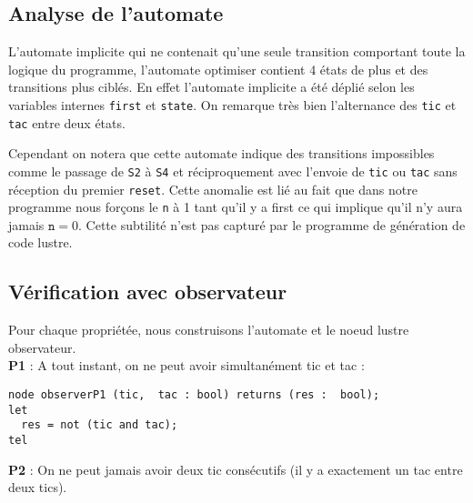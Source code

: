 \documentclass[a4paper]{article}
\begin{document}
\subsection{Analyse de l'automate}

L'automate implicite qui ne contenait qu'une seule transition comportant toute la
logique du programme, l'automate optimiser contient 4 états de plus et des
transitions plus ciblés. En effet l'automate implicite a été déplié selon les
variables internes \texttt{first} et \texttt{state}. On remarque très bien
l'alternance des \texttt{tic} et \texttt{tac} entre deux états. 

Cependant on notera que cette automate indique des transitions impossibles comme 
le passage de \texttt{S2} à \texttt{S4} et réciproquement avec l'envoie de 
\texttt{tic} ou \texttt{tac} sans réception du premier \texttt{reset}. Cette 
anomalie est lié au fait que dans notre programme nous forçons le \texttt{n} à 1
tant qu'il y a first ce qui implique qu'il n'y aura jamais $\texttt{n} = 0$. Cette
subtilité n'est pas capturé par le programme de génération de code lustre.\\

\subsection{Vérification avec observateur}
Pour chaque propriétée, nous construisons l'automate et le noeud lustre 
observateur. \\

\textbf{P1} : A tout instant, on ne peut avoir simultanément tic et tac :\\


\begin{verbatim}
node observerP1 (tic,  tac : bool) returns (res :  bool);
let
  res = not (tic and tac);
tel
\end{verbatim}

\textbf{P2} : On ne peut jamais avoir deux tic consécutifs (il y a exactement un tac entre deux tics).
\end{document}
